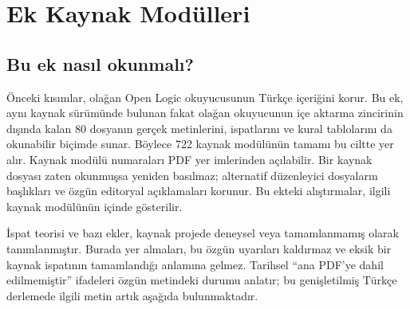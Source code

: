 \clearpage
\allmodulesextratrue
\hypersetup{bookmarksdepth=3}
\allmodulesinlineproblems
\part{Ek Kaynak Modülleri}
\chapter*{Bu ek nasıl okunmalı?}
Önceki kısımlar, olağan Open Logic okuyucusunun Türkçe içeriğini korur.
Bu ek, aynı kaynak sürümünde bulunan fakat olağan okuyucunun içe aktarma
zincirinin dışında kalan 80 dosyanın gerçek metinlerini, ispatlarını ve
kural tablolarını da okunabilir biçimde sunar. Böylece 722 kaynak modülünün
tamamı bu ciltte yer alır. Kaynak modülü numaraları PDF yer imlerinden
açılabilir. Bir kaynak dosyası zaten okunmuşsa yeniden basılmaz; alternatif
düzenleyici dosyaların başlıkları ve özgün editoryal açıklamaları korunur.
Bu ekteki alıştırmalar, ilgili kaynak modülünün içinde gösterilir.

İspat teorisi ve bazı ekler, kaynak projede deneysel veya tamamlanmamış
olarak tanımlanmıştır. Burada yer almaları, bu özgün uyarıları kaldırmaz
ve eksik bir kaynak ispatının tamamlandığı anlamına gelmez. Tarihsel
``ana PDF'ye dahil edilmemiştir'' ifadeleri özgün metindeki durumu anlatır;
bu genişletilmiş Türkçe derlemede ilgili metin artık aşağıda bulunmaktadır.


